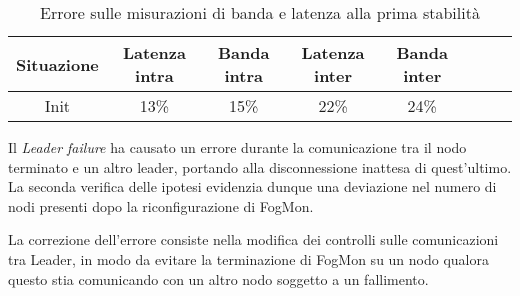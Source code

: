         \begin{table}[H]
            \begin{center}
            \caption{Errore sulle misurazioni di banda e latenza alla prima stabilità}
            \label{tab:leadercrashqos}
                \begin{tabular}{|c|c|c|c|c|c|c|c|}
                    \hline
                    Situazione & Latenza intra & Banda intra & Latenza inter & Banda inter\\
                    \hline
                    Init & 13\% &  15\%  &  22\% &  24\%\\
                    \hline
                \end{tabular}
            \end{center}
        \end{table}
        
        Il \textit{Leader failure} ha causato un errore durante la comunicazione tra il nodo terminato e un altro leader, portando alla disconnessione inattesa di quest'ultimo. La seconda verifica delle ipotesi evidenzia dunque una deviazione nel numero di nodi presenti dopo la riconfigurazione di FogMon.
        
        La correzione dell'errore consiste nella modifica dei controlli sulle comunicazioni tra Leader, in modo da evitare la terminazione di FogMon su un nodo qualora questo stia comunicando con un altro nodo soggetto a un fallimento.
        
        
        
